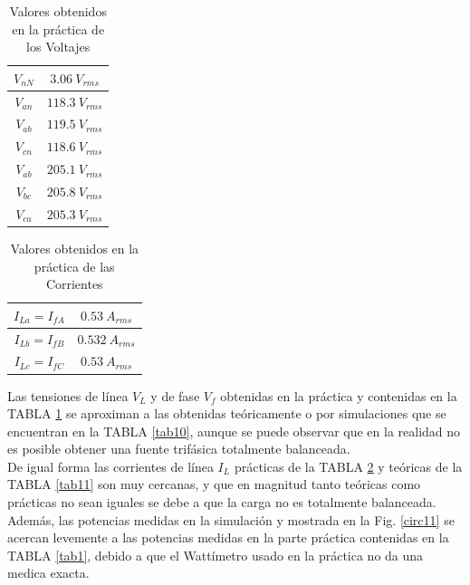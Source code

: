 \documentclass[twocolumn]{IEEEtran}
\begin{document}
\begin{table}[H]
	\centering
\begin{tabular}[c]{|c|c|} \hline
$V_{nN}$ & $3.06\ V_{rms}$ \\ \hline
$V_{an}$ & $118.3\ V_{rms}$ \\ \hline
$V_{ab}$ & $119.5\ V_{rms}$ \\ \hline
$V_{cn}$ & $118.6\ V_{rms}$ \\ \hline
$V_{ab}$ & $205.1\ V_{rms}$ \\ \hline
$V_{bc}$ & $205.8\ V_{rms}$ \\ \hline
$V_{ca}$ & $205.3\ V_{rms}$ \\ \hline
\end{tabular}
	\caption{Valores obtenidos en la práctica de los Voltajes}
	\label{tab2}
\end{table}
\begin{table}[H]
	\centering
\begin{tabular}[c]{|c|c|} \hline
$I_{La} = I_{fA}$ & $0.53\ A_{rms}$ \\ \hline
$I_{Lb} = I_{fB}$ & $0.532\ A_{rms}$ \\ \hline
$I_{Lc} = I_{fC}$ & $0.53\ A_{rms}$ \\ \hline
\end{tabular}
	\caption{Valores obtenidos en la práctica de las Corrientes}
	\label{tab3}
\end{table}
\noindent
Las tensiones de línea $V_L$ y de fase $V_f$ obtenidas en la práctica y contenidas en la TABLA \ref{tab2} se aproximan a las obtenidas teóricamente o por simulaciones que se encuentran en la TABLA \ref{tab10}, aunque se puede observar que en la realidad no es posible obtener una fuente trifásica totalmente balanceada.\\
De igual forma las corrientes de línea $I_L$ prácticas de la TABLA \ref{tab3} y teóricas de la TABLA \ref{tab11} son muy cercanas, y que en magnitud tanto teóricas como prácticas no sean iguales se debe a que la carga no es totalmente balanceada.\\
Además, las potencias medidas en la simulación y mostrada en la Fig. \ref{circ11}  se acercan levemente  a las potencias medidas en la parte práctica contenidas en la TABLA \ref{tab1}, debido a que el Wattímetro usado en la práctica no da una medica exacta.
\end{document}
